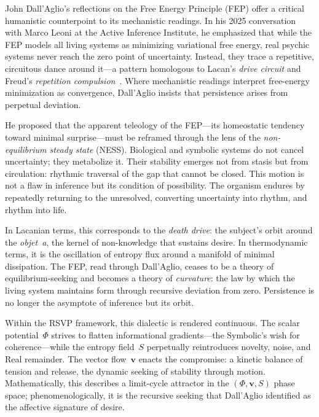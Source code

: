 \documentclass[12pt,a4paper]{article}
\begin{document}
John Dall’Aglio’s reflections on the Free Energy Principle (FEP) offer a critical humanistic counterpoint to its mechanistic readings.  
In his 2025 conversation with Marco Leoni at the Active Inference Institute, he emphasized that while the FEP models all living systems as minimizing variational free energy, real psychic systems never reach the zero point of uncertainty.  
Instead, they trace a repetitive, circuitous dance around it---a pattern homologous to Lacan’s \emph{drive circuit} and Freud’s \emph{repetition compulsion}~\citep{dallaglio2025leanianFEP}.  
Where mechanistic readings interpret free-energy minimization as convergence, Dall’Aglio insists that persistence arises from perpetual deviation.

He proposed that the apparent teleology of the FEP---its homeostatic tendency toward minimal surprise---must be reframed through the lens of the \emph{non-equilibrium steady state} (NESS).  
Biological and symbolic systems do not cancel uncertainty; they metabolize it.  
Their stability emerges not from stasis but from circulation: rhythmic traversal of the gap that cannot be closed.  
This motion is not a flaw in inference but its condition of possibility.  
The organism endures by repeatedly returning to the unresolved, converting uncertainty into rhythm, and rhythm into life.

In Lacanian terms, this corresponds to the \emph{death drive}: the subject’s orbit around the \emph{objet~a}, the kernel of non-knowledge that sustains desire.  
In thermodynamic terms, it is the oscillation of entropy flux around a manifold of minimal dissipation.  
The FEP, read through Dall’Aglio, ceases to be a theory of equilibrium-seeking and becomes a theory of \emph{curvature}: the law by which the living system maintains form through recursive deviation from zero.  
Persistence is no longer the asymptote of inference but its orbit.

Within the RSVP framework, this dialectic is rendered continuous.  
The scalar potential~$\Phi$ strives to flatten informational gradients---the Symbolic’s wish for coherence---while the entropy field~$S$ perpetually reintroduces novelty, noise, and Real remainder.  
The vector flow~$\mathbf{v}$ enacts the compromise: a kinetic balance of tension and release, the dynamic seeking of stability through motion.  
Mathematically, this describes a limit-cycle attractor in the $(\Phi,\mathbf{v},S)$ phase space; phenomenologically, it is the recursive seeking that Dall’Aglio identified as the affective signature of desire.
\end{document}
